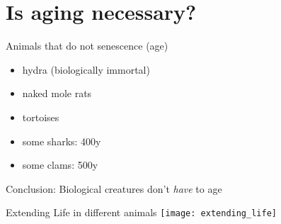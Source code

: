 \section{Is aging necessary?}


\begin{frame}[c]{Animals that do not senescence (age)}
    \large
    \begin{itemize}[<+(1)->]
        \item hydra (biologically immortal) \cite{martinez1998mortality}
        \item naked mole rats \cite{ruby2018naked}
        \item tortoises \cite{miller2001escaping}
        \item some sharks: 400y \cite{Greenlan67:online}
        \item some clams: 500y \cite{munro2012extreme}
    \end{itemize}
    \pause
    Conclusion: Biological creatures don't {\em have} to age
\end{frame}



\begin{frame}[c]{Extending Life in different animals}
    \texttt{[image: extending\_life]} \\
    \cite{bulterijs2015time}
\end{frame}

